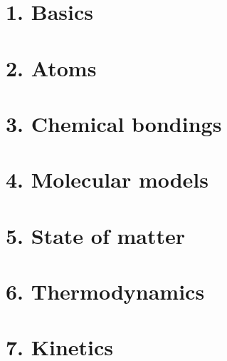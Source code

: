 \documentclass{cheatsheet}
\author{Noa Sendlhofer \& Christian Leser \\ nsendlhofer \& cleser}
\begin{document}
\section{1. Basics} %
	

\section{2. Atoms} %
	
	

\section{3. Chemical bondings} %
	
	
	
	
	
	

\section{4. Molecular models} %
	
	

\section{5. State of matter} %
	
	
	
	
	

\section{6. Thermodynamics} %
	
	
	
	
	
	
	

\section{7. Kinetics} %
	
	
	
	
	
	
	
	
	
\end{document}
